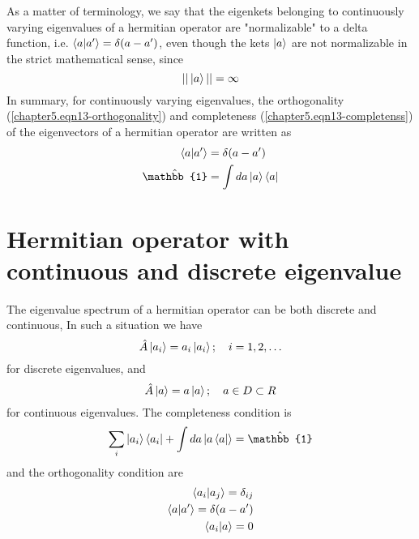 		
		
		As a matter of terminology, we say that the eigenkets belonging to continuously varying eigenvalues of a hermitian operator are "normalizable" to a delta function, i.e. $\braket{a}{a^\prime} = \delta(a-a^\prime)$, even though the kets $\ket{a}$ are not normalizable in the strict mathematical sense, since
		\begin{equation}
			|| \ket{a} || = \infty
		\end{equation}
		In summary, for continuously varying eigenvalues, the orthogonality (\ref{chapter5.eqn13-orthogonality}) and completeness (\ref{chapter5.eqn13-completenss}) of the eigenvectors of a hermitian operator are written as
		\begin{eqnarray}
			\braket{a}{a^\prime} &= \delta(a-a^\prime)  \label{chapter5.eqn13-orthogonality}\\
			\hat{\mathbb{1}} &= \int da  \ket{a}\bra{a}  \label{chapter5.eqn13-completenss}
		\end{eqnarray}
		
		
	\section{Hermitian operator with continuous and discrete eigenvalue}
	The eigenvalue spectrum of a hermitian operator can be both discrete and continuous, In such a situation we have
	\begin{equation}
		\hat{A} \ket{a_i} = a_i \ket{a_i} ; \quad i=1,2,\ldots
	\end{equation}
	for discrete eigenvalues, and
	\begin{equation}
		\hat{A}\ket{a} = a\ket{a};\quad a\in D \subset R
	\end{equation}
	for continuous eigenvalues. The completeness condition is
	\begin{equation}
		\sum_i \ket{a_i}\bra{a_i} + \int da \ket{a\bra{a}} = \hat{\mathbb{1}}
	\end{equation}
	and the orthogonality condition are
	\begin{eqnarray}
		\braket{a_i}{a_j} = \delta_{ij} \\
		\braket{a}{a^\prime} =\delta(a-a^\prime)\\
		\braket{a_i}{a} = 0
	\end{eqnarray}
	
